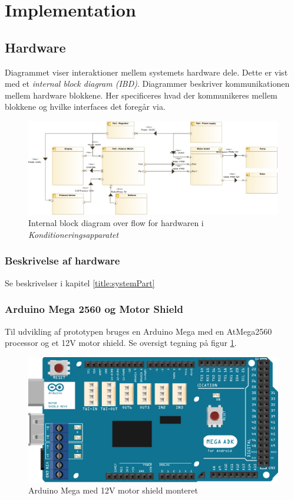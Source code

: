 \section{Implementation}

\subsection{Hardware}
Diagrammet viser interaktioner mellem systemets hardware dele. Dette er vist med et \textit{internal block diagram (IBD)}. Diagrammer beskriver kommunikationen mellem hardware blokkene. Her specificeres hvad der kommunikeres mellem blokkene og hvilke interfaces det foregår via. \\
\begin{figure}[H]
	\includegraphics[width=\textwidth]{SystemArkitektur/pdfs/IBD-Hardware-crop}
	\caption{Internal block diagram over flow for hardwaren i \textit{Konditioneringsapparatet}}
\end{figure}

\subsubsection{Beskrivelse af hardware}
Se beskrivelser i kapitel \ref{title:systemPart}

\subsubsection{Arduino Mega 2560 og Motor Shield}
Til udvikling af prototypen bruges en Arduino Mega med en AtMega2560 processor og et 12V motor shield. Se oversigt tegning på figur \ref{fig:arduinoMega}. \\
\begin{figure}[H]
	\includegraphics[width=\textwidth]{SystemArkitektur/pdfs/MegaPlusShield-crop.pdf}
	\caption{Arduino Mega med 12V motor shield monteret} \label{fig:arduinoMega}
\end{figure}



